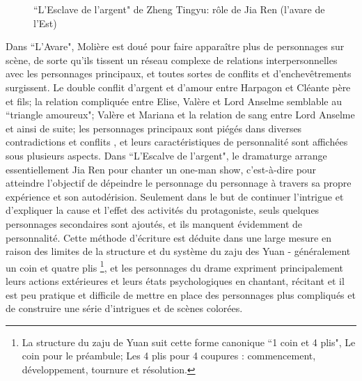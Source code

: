\documentclass[UTF8,a4paper,12pt]{ctexart}
\numberwithin{equation}{section}
\newcommand{\mycite}[1]{\cite{#1}}
\begin{document}
\begin{figure}[H] 
\captionsetup{justification=centering, singlelinecheck=false}
\caption{ ``L'Esclave de l'argent" de Zheng Tingyu: rôle de Jia Ren (l'avare de l'Est)}
\end{figure}

Dans ``L'Avare", Molière est doué pour faire apparaître plus de personnages sur scène, de sorte qu'ils tissent un réseau complexe de relations interpersonnelles avec les personnages principaux, et toutes sortes de conflits et d'enchevêtrements surgissent\mycite{66}. Le double conflit d'argent et d'amour entre Harpagon et Cléante père et fils; la relation compliquée entre Elise, Valère et Lord Anselme semblable au ``triangle amoureux"; Valère et Mariana et la relation de sang entre Lord Anselme et ainsi de suite; les personnages principaux sont piégés dans diverses contradictions et conflits , et leurs caractéristiques de personnalité sont affichées sous plusieurs aspects. Dans ``L'Escalve de l'argent", le dramaturge arrange essentiellement Jia Ren pour chanter un one-man show, c'est-à-dire pour atteindre l'objectif de dépeindre le personnage du personnage à travers sa propre expérience et son autodérision. Seulement dans le but de continuer l'intrigue et d'expliquer la cause et l'effet des activités du protagoniste, seuls quelques personnages secondaires sont ajoutés, et ils manquent évidemment de personnalité. Cette méthode d'écriture est déduite dans une large mesure en raison des limites de la structure et du système du zaju des Yuan - généralement un coin et quatre plis \footnote{La structure du zaju de Yuan suit cette forme canonique ``1 coin et 4 plis", Le coin pour le préambule; Les 4 plis pour 4 coupures : commencement, développement, tournure et résolution.}, et les personnages du drame expriment principalement leurs actions extérieures et leurs états psychologiques en chantant, récitant et il est peu pratique et difficile de mettre en place des personnages plus compliqués et de construire une série d'intrigues et de scènes colorées.
\end{document}
